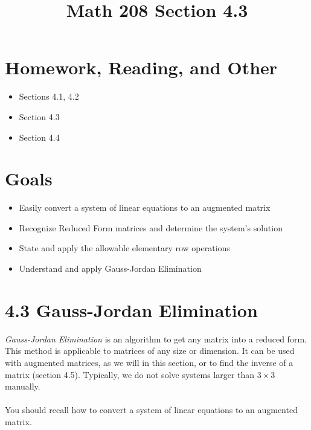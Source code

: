 \documentclass[14pt]{extarticle}
\title{\vspace{-5ex}Math 208 Section 4.3}
\date{\vspace{-10ex}}
\begin{document}
\maketitle		
\section{Homework, Reading, and Other}
\begin{itemize}
\item Sections 4.1, 4.2
\item Section 4.3
\item Section 4.4
\end{itemize}

\section{Goals}
\begin{itemize}
	\item Easily convert a system of linear equations to an augmented matrix
	\item Recognize Reduced Form matrices and determine the system's solution
	\item State and apply the allowable elementary row operations
	\item Understand and apply Gauss-Jordan Elimination
\end{itemize}

\section*{4.3 Gauss-Jordan Elimination}
\textit{Gauss-Jordan Elimination} is an algorithm to get any matrix into a reduced form. This method is applicable to matrices of any size or dimension. It can be used with augmented matrices, as we will in this section, or to find the inverse of a matrix (section 4.5). Typically, we do not solve systems larger than $3 \times 3$ manually.
\\\\
You should recall how to convert a system of linear equations to an augmented matrix.
\end{document}
